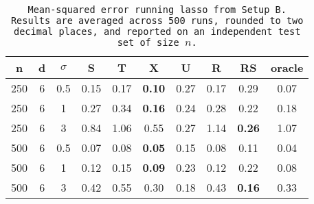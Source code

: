 \begin{table}[ht]
\centering
\begin{tabular}{cccccccccc}
  \hline
n & d & $\sigma$ & S & T & X & U & R & RS & oracle \\ 
  \hline
250 & 6 & 0.5 & 0.15 &  0.17 & \bf 0.10 &  0.27 & 0.17 & 0.29 & 0.07 \\ 
  250 & 6 & 1 & 0.27 &  0.34 & \bf 0.16 &  0.24 & 0.28 & 0.22 & 0.18 \\ 
  250 & 6 & 3 & 0.84 &  1.06 & 0.55 &  0.27 & 1.14 & \bf 0.26 & 1.07 \\ 
  500 & 6 & 0.5 & 0.07 &  0.08 & \bf 0.05 &  0.15 & 0.08 & 0.11 & 0.04 \\ 
  500 & 6 & 1 & 0.12 &  0.15 & \bf 0.09 &  0.23 & 0.12 & 0.22 & 0.08 \\ 
  500 & 6 & 3 & 0.42 &  0.55 & 0.30 &  0.18 & 0.43 & \bf 0.16 & 0.33 \\ 
   \hline
\end{tabular}
\caption{\tt Mean-squared error running \texttt{lasso} from Setup B. Results are averaged across 500 runs, rounded to two decimal places, and reported on an independent test set of size $n$.} 
\label{table:setup2}
\end{table}
